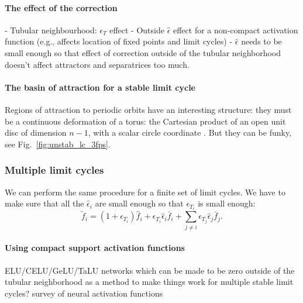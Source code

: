 \documentclass{article}
\theoremstyle{definition}
\theoremstyle{remark}
\newcounter{ct}
\begin{document}
\paragraph{The effect of the correction}
- Tubular neighbourhood: $\epsilon_T$ effect
- Outside $\hat\epsilon$ effect for a non-compact activation function (e.g., affects location of fixed points and limit cycles)
-  $\hat\epsilon$ needs to be small enough so that effect of correction outside of the tubular neighborhood doesn't affect attractors and separatrices too much.


\paragraph{The basin of attraction for a stable limit cycle}%
Regions of attraction to periodic orbits have an interesting structure: they must be a continuous deformation of a torus: the Cartesian product of an open unit disc of dimension $n-1$, with a scalar circle coordinate \citep{wilson1967structure}.
But they can be funky, see Fig.~\ref{fig:unstab_lc_3fps}.





\subsubsection{Multiple limit cycles}
We can perform the same procedure for a finite set of limit cycles.
We have to make sure that all the $\hat{\epsilon}_i$ are small enough so that $\epsilon_{T_i}$ is small enough:
\[ \tilde f_i = (1+ \epsilon_{T_i})\hat{f}_i + \epsilon_{T_i}\hat{\epsilon}_i\bar{f}_i + \sum_{j\neq i}\epsilon_{T_j}\hat{\epsilon}_j\bar{f}_j.\]


\paragraph{Using compact support activation functions}
 ELU/CELU/GeLU/TaLU networks\citep{clevert2015elu,barron2017celu,elfwing2018sigmoid,hasan2023talu} which can be made to be zero outside of the tubular neighborhood as a method to make things work for multiple stable limit cycles?
\citep{duch1999survey,dubey2022activation,jagtap2023activation,ramachandran2017activation,hayou2019activation} survey of neural activation functions
\end{document}
